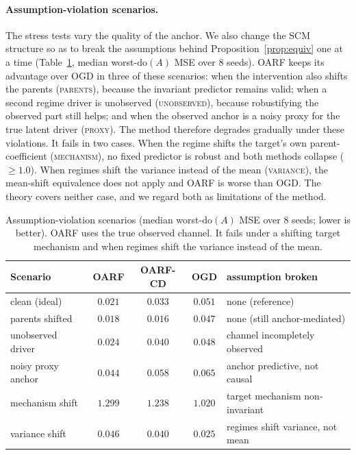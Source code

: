 \documentclass[11pt]{article}
\theoremstyle{plain}
\theoremstyle{remark}
\newcommand{\doop}{\mathrm{do}}
\newcommand{\OARF}{\textsc{OARF}}
\newcommand{\OARFCD}{\textsc{OARF-CD}}
\begin{document}
\paragraph{Assumption-violation scenarios.}
The stress tests vary the quality of the anchor. We also change the SCM structure so as
to break the assumptions behind Proposition~\ref{prop:equiv} one at a time
(Table~\ref{tab:scen}, median worst-$\doop(A)$ MSE over 8 seeds). \OARF{} keeps its
advantage over OGD in three of these scenarios: when the intervention also shifts the
parents (\textsc{parents}), because the invariant predictor remains valid; when a second
regime driver is unobserved (\textsc{unobserved}), because robustifying the observed
part still helps; and when the observed anchor is a noisy proxy for the true latent
driver (\textsc{proxy}). The method therefore degrades gradually under these
violations. It fails in two cases. When the regime shifts the target's own
parent-coefficient (\textsc{mechanism}), no fixed predictor is robust and both methods
collapse ($\ge\!1.0$). When regimes shift the variance instead of the mean
(\textsc{variance}), the mean-shift equivalence does not apply and \OARF{} is worse than
OGD. The theory covers neither case, and we regard both as limitations of the method.

\begin{table}[htbp]
\centering
\caption{Assumption-violation scenarios (median worst-$\doop(A)$ MSE over 8 seeds;
lower is better). \OARF{} uses the true observed channel. It fails under a shifting
target mechanism and when regimes shift the variance instead of the mean.}
\label{tab:scen}
\small
\begin{tabular}{lcccl}
\toprule
Scenario & \OARF{} & \OARFCD{} & OGD & assumption broken\\
\midrule
clean (ideal)      & $0.021$ & $0.033$ & $0.051$ & none (reference)\\
parents shifted    & $0.018$ & $0.016$ & $0.047$ & none (still anchor-mediated)\\
unobserved driver  & $0.024$ & $0.040$ & $0.048$ & channel incompletely observed\\
noisy proxy anchor & $0.044$ & $0.058$ & $0.065$ & anchor predictive, not causal\\
\midrule
mechanism shift    & $1.299$ & $1.238$ & $1.020$ & target mechanism non-invariant\\
variance shift     & $0.046$ & $0.040$ & $0.025$ & regimes shift variance, not mean\\
\bottomrule
\end{tabular}
\end{table}
\end{document}
